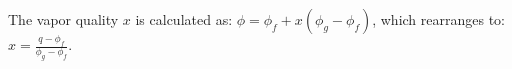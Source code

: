 The vapor quality \( x \) is calculated as:  
\( \phi = \phi_f + x (\phi_g - \phi_f) \),  
which rearranges to:  
\( x = \frac{q - \phi_f}{\phi_g - \phi_f} \).